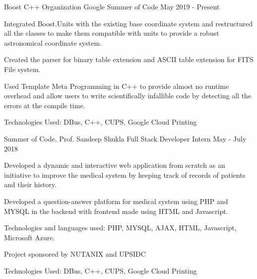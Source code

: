 \begin{cventries}
{\Large
  
  \cventry
  {Boost C++ Organization}
  {Google Summer of Code}
  {}
  {May 2019 - Present}
  {
    \begin{cvitems}
      \item Integrated Boost.Units with the existing base coordinate system and restructured all the classes to make them compatible with units to provide a robust astronomical coordinate system.\vspace{1mm}
      \item Created the parser for binary table extension and ASCII table extension for FITS File system.
        \vspace{1.0mm}
      \item Used Template Meta Programming in C++ to provide almost no runtime overhead and allow users to write scientifically infallible code by detecting all the errors at the compile time.
     
      \vspace{1mm}
        \ifdefined \ONEPAGE \else
      \item Technologies Used: DBus, C++, CUPS, Google Cloud Printing
        \fi
    \end{cvitems}
  }

\cventry
  {Summer of Code, Prof. Sandeep Shukla}
  {Full Stack Developer Intern}
  {}
  {May - July 2018}
  {
    \begin{cvitems}
      \item Developed a dynamic and interactive web application from scratch as an initiative to improve the medical system by keeping track of
records of patients and their history.\vspace{1mm}
      \item Developed a question-answer platform for medical system using PHP and MYSQL in the backend with frontend made using HTML and Javascript.
        \vspace{1mm}
      \item Technologies and languages used: PHP, MYSQL, AJAX, HTML, Javascript, Microsoft Azure.
      \vspace{1mm}
      \item Project sponsored by NUTANIX and UPSIDC
      \vspace{1mm}
        \ifdefined \ONEPAGE \else
      \item Technologies Used: DBus, C++, CUPS, Google Cloud Printing
        \fi
    \end{cvitems}
  }
  
}
\end{cventries}
